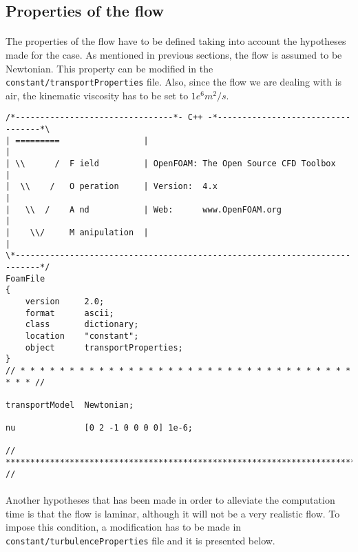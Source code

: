 \subsection{Properties of the flow}

\paragraph{}The properties of the flow have to be defined taking into account the hypotheses made for the case. As mentioned in previous sections, the flow is assumed to be Newtonian. This property can be modified in the \texttt{constant/transportProperties} file. Also, since the flow we are dealing with is air, the kinematic viscosity has to be set to $1e^{6} m^2/s$.

\begin{footnotesize}
\begin{verbatim}
/*--------------------------------*- C++ -*----------------------------------*\
| =========                 |                                                 |
| \\      /  F ield         | OpenFOAM: The Open Source CFD Toolbox           |
|  \\    /   O peration     | Version:  4.x                                   |
|   \\  /    A nd           | Web:      www.OpenFOAM.org                      |
|    \\/     M anipulation  |                                                 |
\*---------------------------------------------------------------------------*/
FoamFile
{
    version     2.0;
    format      ascii;
    class       dictionary;
    location    "constant";
    object      transportProperties;
}
// * * * * * * * * * * * * * * * * * * * * * * * * * * * * * * * * * * * * * //

transportModel  Newtonian;

nu              [0 2 -1 0 0 0 0] 1e-6;

// ************************************************************************* //
\end{verbatim}
\end{footnotesize}

\paragraph{}Another hypotheses that has been made in order to alleviate the computation time is that the flow is laminar, although it will not be a very realistic flow. To impose this condition, a modification has to be made in \texttt{constant/turbulenceProperties} file and it is presented below.


